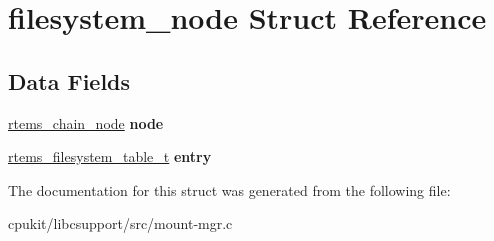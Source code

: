 \hypertarget{structfilesystem__node}{}\section{filesystem\+\_\+node Struct Reference}
\label{structfilesystem__node}
\subsection*{Data Fields}
\begin{DoxyCompactItemize}
\item 
\mbox{\label{structfilesystem__node_a0aa797eec8439de662344cc14fe76efc}} 
\mbox{\hyperlink{structChain__Node__struct}{rtems\+\_\+chain\+\_\+node}} {\bfseries node}
\item 
\mbox{\label{structfilesystem__node_a3b851dcdf9bc9b5a86efcb955efa9fe7}} 
\mbox{\hyperlink{structrtems__filesystem__table__t}{rtems\+\_\+filesystem\+\_\+table\+\_\+t}} {\bfseries entry}
\end{DoxyCompactItemize}


The documentation for this struct was generated from the following file\+:\begin{DoxyCompactItemize}
\item 
cpukit/libcsupport/src/mount-\/mgr.\+c\end{DoxyCompactItemize}
